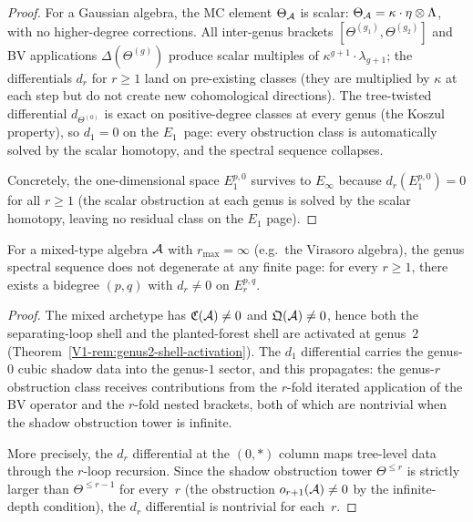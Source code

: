 \begin{proof}
For a Gaussian algebra, the MC element $\Theta_{\mathcal{A}}$ is
scalar: $\Theta_{\mathcal{A}} = \kappa \cdot \eta \otimes \Lambda$,
with no higher-degree corrections. All inter-genus
brackets $[\Theta^{(g_1)},\Theta^{(g_2)}]$ and BV applications
$\Delta(\Theta^{(g)})$ produce scalar multiples of
$\kappa^{g+1} \cdot \lambda_{g+1}$; the differentials $d_r$
for $r \geq 1$ land on pre-existing classes (they are
multiplied by $\kappa$ at each step but do not create new
cohomological directions). The tree-twisted differential
$d_{\Theta^{(0)}}$ is exact on positive-degree classes at
every genus (the Koszul property), so $d_1 = 0$ on the
$E_1$~page: every obstruction class is automatically solved
by the scalar homotopy, and the spectral sequence collapses.

Concretely, the one-dimensional space $E_1^{p,0}$ survives
to $E_\infty$ because $d_r(E_1^{p,0}) = 0$ for all $r \geq 1$
(the scalar obstruction at each genus is solved by the scalar
homotopy, leaving no residual class on the $E_1$ page).
\end{proof}

\begin{proposition}
\label{prop:thqg-VII-mixed-nondegeneration}
For a mixed-type algebra $\mathcal{A}$ with $r_{\max} = \infty$
\textup{(}e.g.\ the Virasoro algebra\textup{)}, the genus
spectral sequence does not degenerate at any finite page:
for every $r \geq 1$, there exists a bidegree $(p,q)$ with
$d_r \neq 0$ on $E_r^{p,q}$.
\end{proposition}

\begin{proof}
The mixed archetype has $\mathfrak{C}(\mathcal{A}) \neq 0$ and
$\mathfrak{Q}(\mathcal{A}) \neq 0$, hence both the separating-loop
shell and the planted-forest shell are activated at genus~$2$
(Theorem~\ref{V1-rem:genus2-shell-activation}). The $d_1$
differential carries the genus-$0$ cubic shadow data into the
genus-$1$ sector, and this propagates: the genus-$r$
obstruction class receives contributions from the
$r$-fold iterated application of the BV operator and the
$r$-fold nested brackets, both of which are nontrivial when
the shadow obstruction tower is infinite.

More precisely, the $d_r$ differential at the $(0,*)$ column
maps tree-level data through the $r$-loop recursion. Since
the shadow obstruction tower $\Theta^{\leq r}$ is strictly larger than
$\Theta^{\leq r-1}$ for every~$r$ (the obstruction
$o_{r+1}(\mathcal{A}) \neq 0$ by the infinite-depth condition),
the $d_r$ differential is nontrivial for each~$r$.
\end{proof}

